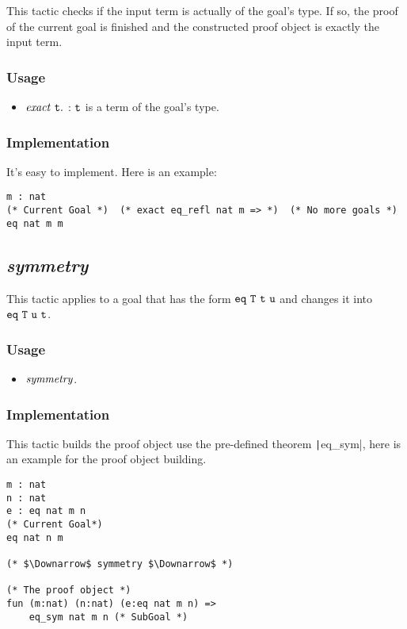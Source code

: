 This tactic checks if the input term is actually of the goal's type. If so, the proof of the current goal is finished and the 
constructed proof object is exactly the input term.

\subsubsection*{Usage}
\begin{itemize}
\item ${\it exact}\ \tt t.$ : $\tt t$ is a term of the goal's type. 
\end{itemize}

\subsubsection*{Implementation}
It's easy to implement. Here is an example:
\begin{center}
\begin{minipage}{0.8\textwidth}
\begin{verbatim}
m : nat                                                      
(* Current Goal *)  (* exact eq_refl nat m => *)  (* No more goals *)
eq nat m m                                       
\end{verbatim}
\end{minipage}
\end{center}


\subsection{\it symmetry}
This tactic applies to a goal that has the form $\tt eq\ T\ t\ u$ 
and changes it into $\tt eq\ T\ u\ t$.

\subsubsection*{Usage}
\begin{itemize}
\item ${\it symmetry}$.
\end{itemize}

\subsubsection*{Implementation}
This tactic builds the proof object use the pre-defined theorem \texttt|eq_sym|, here is an example for the proof object building.
\begin{center}
\begin{minipage}{0.6\textwidth}
\begin{verbatim}
m : nat
n : nat
e : eq nat m n                    
(* Current Goal*)                              
eq nat n m                           

(* $\Downarrow$ symmetry $\Downarrow$ *)   

(* The proof object *)
fun (m:nat) (n:nat) (e:eq nat m n) =>   
    eq_sym nat m n (* SubGoal *)                                                
\end{verbatim}
\end{minipage}
\end{center}


